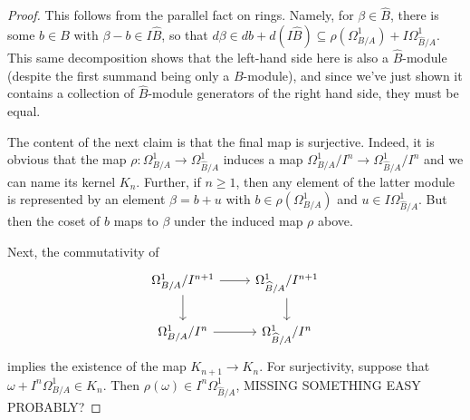 \begin{proof}
	This follows from the parallel fact on rings. Namely, for $\beta \in \widehat{B}$, there is some $b \in B$ with $\beta - b \in I\widehat{B}$, so that $d\beta \in db + d\left(I\widehat{B}\right) \subseteq \rho(\Omega^1_{B/A})+I\Omega^1_{\widehat{B}/A}$. This same decomposition shows that the left-hand side here is also a $\widehat{B}$-module (despite the first summand being only a $B$-module), and since we've just shown it contains a collection of $\widehat{B}$-module generators of the right hand side, they must be equal.
	
	The content of the next claim is that the final map is surjective. Indeed, it is obvious that the map $\rho : \Omega^1_{B/A} \to \Omega^1_{\widehat{B}/A}$ induces a map $\Omega^1_{B/A}/I^n \to \Omega^1_{\widehat{B}/A}/I^n$ and we can name its kernel $K_n$. Further, if $n \geq 1$, then any element of the latter module is represented by an element $\beta = b+u$ with $b \in \rho(\Omega^1_{B/A})$ and $u \in I\Omega^1_{\widehat{B}/A}$. But then the coset of $b$ maps to $\beta$ under the induced map $\rho$ above.
	
	Next, the commutativity of
	\[ \begin{tikzcd} \Omega^1_{B/A}/I^{n+1} \arrow[r] \arrow[d] & \Omega^1_{\widehat{B}/A}/I^{n+1} \arrow[d] \\ \Omega^1_{B/A}/I^n \arrow[r] & \Omega^1_{\widehat{B}/A}/I^n \end{tikzcd} \]
	implies the existence of the map $K_{n+1} \to K_n$. For surjectivity, suppose that $\omega+I^n\Omega^1_{B/A} \in K_n$. Then $\rho(\omega) \in I^n\Omega^1_{\widehat{B}/A}$, MISSING SOMETHING EASY PROBABLY?
\end{proof}
